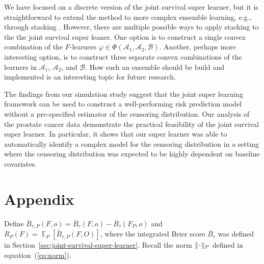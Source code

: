 \documentclass[alpha-refs]{wiley-article}
\DeclareMathOperator{\E}{\mathbb{E}} %
\newcommand{\blank}{\makebox[1ex]{\textbf{$\cdot$}}}
\renewcommand{\phi}{\varphi}
\newcommand{\1}{\mathbb{1}}
\begin{document}
We have focused on a discrete version of the joint survival super
learner, but it is straightforward to extend the method to more
complex ensemble learning, e.g., through
stacking \citep{breiman1996stacked}. However, there are multiple possible
ways to apply stacking to the the joint survival super leaner. One
option is to construct a single convex combination of the \( F \)-learners
\( \phi \in \Phi(\mathcal{A}_1, \mathcal{A}_2, \mathcal{B})
\). Another, perhaps more interesting option, is to construct three
separate convex combinations of the learners in \( \mathcal{A}_1 \),
\( \mathcal{A}_2 \), and \( \mathcal{B} \).  How such an ensemble
should be build and implemented is an interesting topic for future
research.

The findings from our simulation study suggest that the joint super
learning framework can be used to construct a well-performing
risk prediction model without a pre-specified estimator of the
censoring distribution. Our analysis of the prostate cancer data
demonstrate the practical feasibility of the joint survival super
learner. In particular, it shows that our super learner was able to
automatically identify a complex model for the censoring distribution
in a setting where the censoring distribution was expected to be
highly dependent on baseline covariates. 


\appendix

\section*{Appendix}


Define
\( \bar{B}_{\tau,P}(F, o) = \bar{B}_{\tau}(F, o) -
\bar{B}_{\tau}(F_P, o) \) and
\( R_{P}(F) = \E_P{[\bar{B}_{\tau,P}(F, O)]} \), where the
integrated Brier score \( \bar{B}_{\tau} \) was defined in
Section~\ref{sec:joint-survival-super-learner}. Recall the norm
\( \Vert \blank \Vert_{P}\) defined in
equation~(\ref{eq:norm}).
\end{document}
